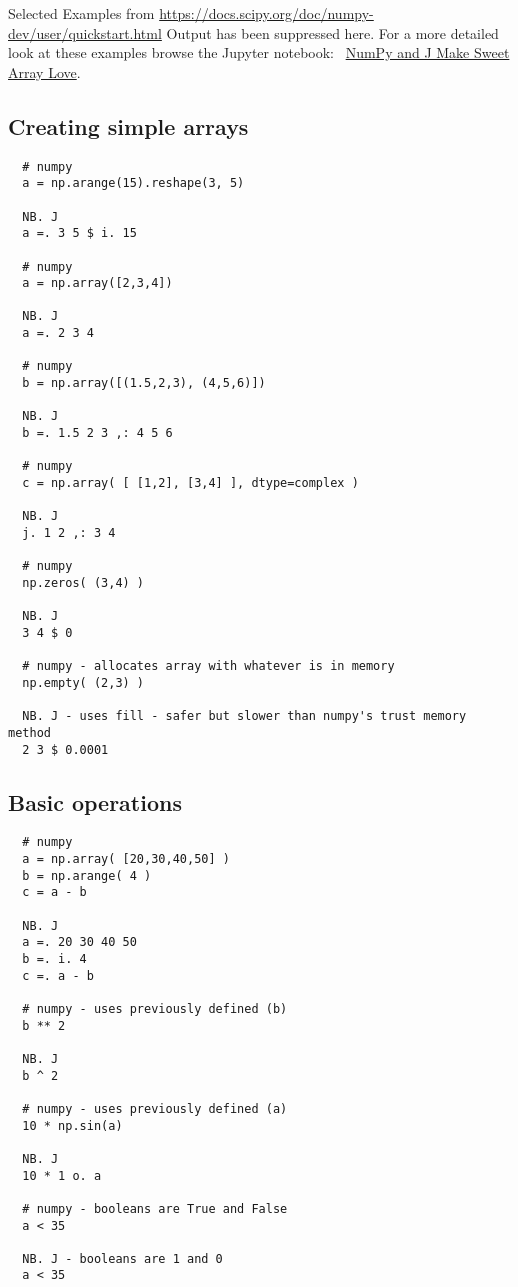 Selected Examples from
\url{https://docs.scipy.org/doc/numpy-dev/user/quickstart.html} Output
has been suppressed here. For a more detailed look at these examples
browse the Jupyter notebook:~
\href{https://github.com/bakerjd99/jacks/blob/master/numpyjlove/NumPy\%20and\%20J\%20make\%20Sweet\%20Array\%20Love.ipynb}{NumPy
and J Make Sweet Array Love}.


\subsection*{Creating simple arrays}

\begin{verbatim}
  # numpy
  a = np.arange(15).reshape(3, 5)
    
  NB. J 
  a =. 3 5 $ i. 15

  # numpy 
  a = np.array([2,3,4]) 
   
  NB. J 
  a =. 2 3 4  
  
  # numpy 
  b = np.array([(1.5,2,3), (4,5,6)]) 
   
  NB. J 
  b =. 1.5 2 3 ,: 4 5 6

  # numpy 
  c = np.array( [ [1,2], [3,4] ], dtype=complex ) 
  
  NB. J 
  j. 1 2 ,: 3 4  
  
  # numpy 
  np.zeros( (3,4) )  
  
  NB. J 
  3 4 $ 0  
  
  # numpy - allocates array with whatever is in memory 
  np.empty( (2,3) )  
  
  NB. J - uses fill - safer but slower than numpy's trust memory method 
  2 3 $ 0.0001 
\end{verbatim}

\subsection*{Basic operations}

\begin{verbatim}
  # numpy 
  a = np.array( [20,30,40,50] ) 
  b = np.arange( 4 ) 
  c = a - b  
  
  NB. J 
  a =. 20 30 40 50 
  b =. i. 4 
  c =. a - b  
  
  # numpy - uses previously defined (b) 
  b ** 2  
  
  NB. J 
  b ^ 2

  # numpy - uses previously defined (a) 
  10 * np.sin(a)  
  
  NB. J 
  10 * 1 o. a  
  
  # numpy - booleans are True and False 
  a < 35  
  
  NB. J - booleans are 1 and 0 
  a < 35
\end{verbatim}

